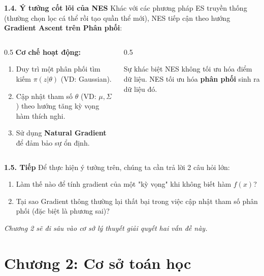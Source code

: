 \documentclass[10pt,xcolor=dvipsnames]{beamer}
\begin{document}
\begin{frame}{\textbf{1.4. Ý tưởng cốt lõi của NES}}
	Khác với các phương pháp ES truyền thống (thường chọn lọc cá thể rồi tạo quần thể mới), NES tiếp cận theo hướng \textbf{Gradient Ascent trên Phân phối}:
	
	\begin{columns}
		\begin{column}{0.5\textwidth}
			\textbf{Cơ chế hoạt động:}
			\begin{enumerate}
				\item Duy trì một phân phối tìm kiếm $\pi(z|\theta)$ (VD: Gaussian).
				\item Cập nhật tham số $\theta$ (VD: $\mu, \Sigma$) theo hướng tăng kỳ vọng hàm thích nghi.
				\item Sử dụng \textbf{Natural Gradient} để đảm bảo sự ổn định.
			\end{enumerate}
		\end{column}
		\begin{column}{0.5\textwidth}
			\begin{exampleblock}{Sự khác biệt}
				NES không tối ưu hóa điểm dữ liệu. NES tối ưu hóa \textbf{phân phối} sinh ra dữ liệu đó.
			\end{exampleblock}
		\end{column}
	\end{columns}
\end{frame}

\begin{frame}{\textbf{1.5. Tiếp}}
	Để thực hiện ý tưởng trên, chúng ta cần trả lời 2 câu hỏi lớn:
	\begin{enumerate}
		\item Làm thế nào để tính gradient của một "kỳ vọng" khi không biết hàm $f(x)$?
		\item Tại sao Gradient thông thường lại thất bại trong việc cập nhật tham số phân phối (đặc biệt là phương sai)?
	\end{enumerate}
	
	\vspace{0.5cm}
	\textit{Chương 2 sẽ đi sâu vào cơ sở lý thuyết giải quyết hai vấn đề này.}
\end{frame}

\section{Chương 2: Cơ sở toán học}
\end{document}
